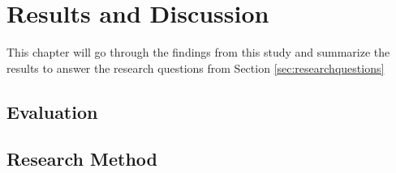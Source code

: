\chapter{Results and Discussion}
\label{chp:resultsanddiscussion}

This chapter will go through the findings from this study and summarize the results to answer the research questions from Section \ref{sec:researchquestions}


\section{Evaluation}


\section{Research Method}


